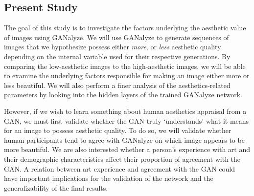 \documentclass[../main.tex]{subfiles}
\begin{document}
\subsection{Present Study}
The goal of this study is to investigate the factors underlying the aesthetic value of images using GANalyze. We will use GANalyze to generate sequences of images that we hypothesize possess either \textit{more}, or \textit{less} aesthetic quality depending on the internal variable used for their respective generations. By comparing the low-aesthetic images to the high-aesthetic images, we will be able to examine the underlying factors responsible for making an image either more or less beautiful. We will also perform a finer analysis of the aesthetics-related parameters by looking into the hidden layers of the trained GANalyze network.


However, if we wish to learn something about human aesthetics appraisal from a GAN, we must first validate whether the GAN truly `understands' what it means for an image to possess aesthetic quality. To do so, we will validate whether human participants tend to agree with GANalyze on which image appears to be more beautiful. We are also interested whether a person's experience with art and their demographic characteristics affect their proportion of agreement with the GAN. A relation between art experience and agreement with the GAN could have important implications for the validation of the network and the generalizability of the final results.
\end{document}
